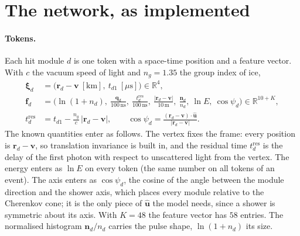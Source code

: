 \documentclass[11pt]{article}
\theoremstyle{definition}
\newcommand{\R}{\mathbb{R}}
\begin{document}
\section{The network, as implemented}

\paragraph{Tokens.}
Each hit module $d$ is one token with a space-time position and a feature vector. With $c$ the vacuum speed of
light and $n_g=1.35$ the group index of ice,
\begin{align}
  \bm\xi_d &= \big(\bm r_d-\bm v\ [\mathrm{km}],\ t_{d1}\ [\mu\mathrm s]\big)\in\R^4, \label{eq:xi}\\
  \bm f_d &= \Big(\ln(1+n_d),\ \frac{\bm q_d}{100\,\mathrm{ns}},\ \frac{t^{\mathrm{res}}_d}{100\,\mathrm{ns}},\
             \frac{|\bm r_d-\bm v|}{10\,\mathrm m},\ \frac{\bm n_d}{n_d},\ \ln E,\ \cos\psi_d\Big)\in\R^{10+K}, \label{eq:f}\\
  t^{\mathrm{res}}_d &= t_{d1} - \frac{n_g}{c}\,|\bm r_d-\bm v| ,\qquad
  \cos\psi_d = \frac{(\bm r_d-\bm v)\cdot\hat{\bm u}}{|\bm r_d-\bm v|} .
\end{align}
The known quantities enter as follows. The vertex fixes the frame: every position is $\bm r_d-\bm v$, so
translation invariance is built in, and the residual time $t^{\mathrm{res}}_d$ is the delay of the first photon
with respect to unscattered light from the vertex. The energy enters as $\ln E$ on every token (the same number on
all tokens of an event). The axis enters as $\cos\psi_d$, the cosine of the angle between the module direction and
the shower axis, which places every module relative to the Cherenkov cone; it is the only piece of
$\hat{\bm u}$ the model needs, since a shower is symmetric about its axis. With $K=48$ the feature vector has
$58$ entries. The normalised histogram $\bm n_d/n_d$ carries the pulse shape, $\ln(1+n_d)$ its size.
\end{document}
